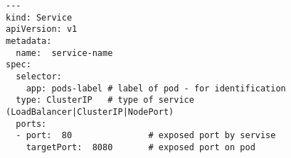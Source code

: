 \begin{lstfloat}
\begin{lstlisting}[style=mybashstyle,
caption={Ukázka reprezentace objektu SERVICE},
label={sample:service}
]
---
kind: Service
apiVersion: v1
metadata:
  name:  service-name
spec:
  selector:
    app: pods-label # label of pod - for identification 
  type: ClusterIP   # type of service (LoadBalancer|ClusterIP|NodePort)
  ports:
  - port:  80               # exposed port by servise
    targetPort:  8080       # exposed port on pod
\end{lstlisting}
\end{lstfloat}